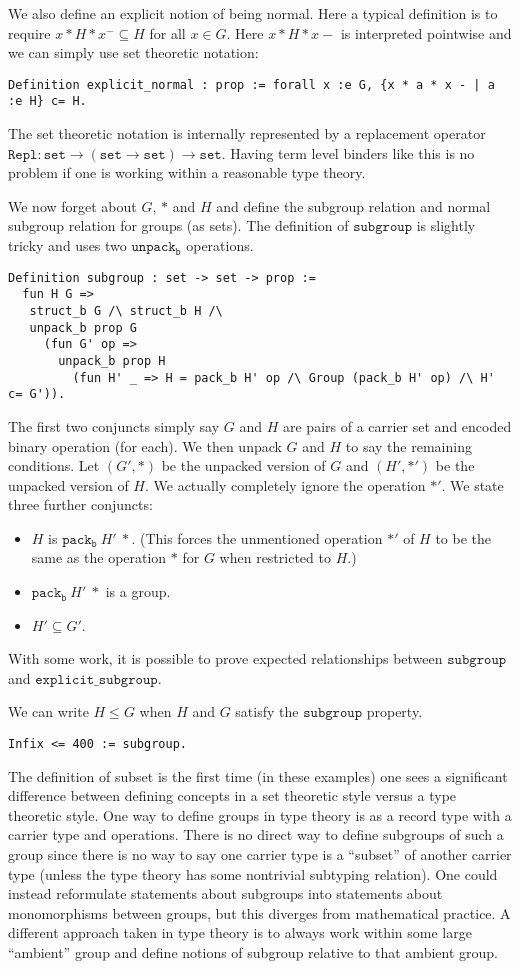 \documentclass{article}
\begin{document}
We also define an explicit notion of being normal. Here a typical definition is to require $x * H * x^-\subseteq H$
for all $x\in G$. Here $x * H * x-$ is interpreted pointwise and we can simply use set theoretic notation:
\begin{verbatim}
Definition explicit_normal : prop := forall x :e G, {x * a * x - | a :e H} c= H.
\end{verbatim}
The set theoretic notation is internally represented by a replacement operator $\mathtt{Repl}:\mathtt{set}\to(\mathtt{set}\to\mathtt{set})\to\mathtt{set}$.
Having term level binders like this is no problem if one is working within a reasonable type theory.

We now forget about $G$, $*$ and $H$ and define the subgroup relation and normal subgroup relation
for groups (as sets). The definition of $\mathtt{subgroup}$ is slightly tricky and uses two $\mathtt{unpack_b}$ operations.
\begin{verbatim}
Definition subgroup : set -> set -> prop :=
  fun H G =>
   struct_b G /\ struct_b H /\
   unpack_b prop G
     (fun G' op =>
       unpack_b prop H
         (fun H' _ => H = pack_b H' op /\ Group (pack_b H' op) /\ H' c= G')).
\end{verbatim}
The first two conjuncts simply say $G$ and $H$ are pairs of a carrier set and encoded binary operation (for each).
We then unpack $G$ and $H$ to say the remaining conditions.
Let $(G',*)$ be the unpacked version of $G$ and $(H',*')$ be the unpacked version of $H$.
We actually completely ignore the operation $*'$. We state three further conjuncts:
\begin{itemize}
\item $H$ is $\mathtt{pack_b}~H'~*$. (This forces the unmentioned operation $*'$ of $H$ to be the same as the operation $*$ for $G$ when restricted to $H$.)
\item $\mathtt{pack_b}~H'~*$ is a group.
\item $H'\subseteq G'$.
\end{itemize}
With some work, it is possible to prove expected relationships between $\mathtt{subgroup}$ and $\mathtt{explicit\_subgroup}$.

We can write $H\leq G$ when $H$ and $G$ satisfy the $\mathtt{subgroup}$ property.
\begin{verbatim}
Infix <= 400 := subgroup.
\end{verbatim}

The definition of subset is the first time (in these examples) one sees a significant difference
between defining concepts in a set theoretic style versus a type theoretic style.
One way to define groups in type theory is as a record type with a carrier type and operations.
There is no direct way to define subgroups of such a group since there is no way to
say one carrier type is a ``subset'' of another carrier type (unless the type theory has some nontrivial subtyping relation).
One could instead reformulate statements about subgroups into statements about monomorphisms
between groups, but this diverges from mathematical practice.
A different approach taken in type theory is to always work within some large ``ambient'' group and
define notions of subgroup relative to that ambient group.
\end{document}
